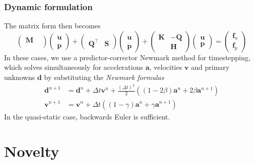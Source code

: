 \documentclass{beamer}
\begin{document}
\begin{frame}
  \frametitle{Dynamic formulation}

  The matrix form then becomes
  \[
    \begin{pmatrix} \bm{M} & \\ & \end{pmatrix}
    \begin{pmatrix} \ddot{\bm{u}} \\ \ddot{\bm{p}} \end{pmatrix} +
    \begin{pmatrix} & \\ \bm{Q}^\intercal & \bm{S} \end{pmatrix}
    \begin{pmatrix} \dot{\bm{u}} \\ \dot{\bm{p}} \end{pmatrix} +
    \begin{pmatrix} \bm{K} & -\bm{Q} \\ & \bm{H} \end{pmatrix}
    \begin{pmatrix} \bm{u} \\ \bm{p} \end{pmatrix} =
    \begin{pmatrix} \bm{f}_u \\ \bm{f}_p \end{pmatrix}
  \]
  In these cases, we use a predictor-corrector Newmark method for timestepping,
  which solves simultaneously for accelerations $\bm a$, velocities $\bm v$ and
  primary unknowns $\bm d$ by substituting the \emph{Newmark formulas}
  \begin{align*}
    \bm d^{n+1} &= \bm d^n + \Delta t \bm v^n +
    \frac{(\Delta t)^2}{2} \left( (1-2\beta)\bm a^n + 2\beta\bm a^{n+1} \right) \\
    \bm v^{n+1} &= \bm v^n + \Delta t \left( (1-\gamma)\bm a^n + \gamma \bm a^{n+1} \right)
  \end{align*}
  In the quasi-static case, backwards Euler is sufficient.
\end{frame}

\section{Novelty}
\end{document}
